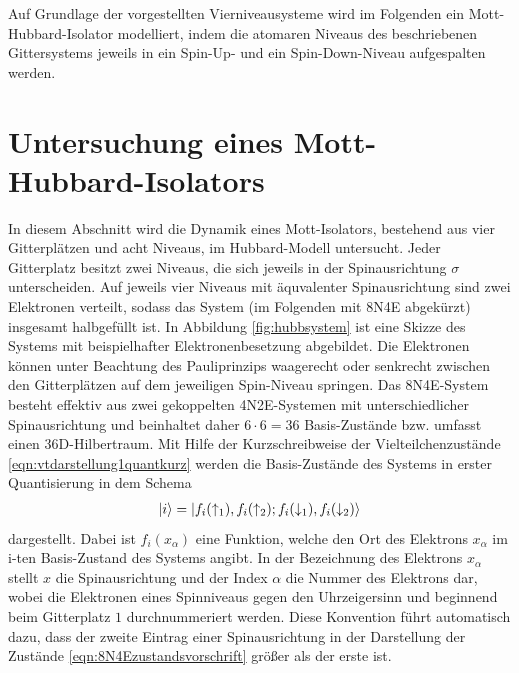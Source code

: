 Auf Grundlage der vorgestellten Vierniveausysteme wird im Folgenden ein Mott-Hubbard-Isolator modelliert, indem die atomaren Niveaus des
beschriebenen Gittersystems jeweils in ein Spin-Up- und ein Spin-Down-Niveau aufgespalten werden.

\section{Untersuchung eines Mott-Hubbard-Isolators}
\label{sec:untersuchunghubb}

In diesem Abschnitt wird die Dynamik eines Mott-Isolators, bestehend aus vier Gitterplätzen und acht Niveaus, im Hubbard-Modell untersucht.
Jeder Gitterplatz besitzt zwei Niveaus, die sich jeweils in der Spinausrichtung $\sigma$ unterscheiden.
Auf jeweils vier Niveaus mit äquvalenter Spinausrichtung sind zwei Elektronen verteilt, sodass das System (im Folgenden mit 8N4E abgekürzt) insgesamt halbgefüllt ist.
In Abbildung \ref{fig:hubbsystem} ist eine Skizze des Systems mit beispielhafter Elektronenbesetzung abgebildet.
Die Elektronen können unter Beachtung des Pauliprinzips waagerecht oder senkrecht zwischen den Gitterplätzen auf dem jeweiligen Spin-Niveau springen.
Das 8N4E-System besteht effektiv aus zwei gekoppelten 4N2E-Systemen mit unterschiedlicher Spinausrichtung und
beinhaltet daher $6 \cdot 6=36$ Basis-Zustände bzw. umfasst einen 36D-Hilbertraum.
Mit Hilfe der Kurzschreibweise der Vielteilchenzustände \eqref{eqn:vtdarstellung1quantkurz} werden die Basis-Zustände des Systems in erster Quantisierung in dem Schema
\begin{align}
  \ket{i} = \ket{f_i(\uparrow_1),f_i(\uparrow_2); f_i(\downarrow_1),f_i(\downarrow_2)}
  \label{eqn:8N4Ezustandsvorschrift}
\end{align}
dargestellt. Dabei ist $f_i(x_\alpha)$ eine Funktion, welche den Ort des Elektrons $x_\alpha$ im i-ten Basis-Zustand des Systems angibt.
In der Bezeichnung des Elektrons $x_\alpha$ stellt $x$ die Spinausrichtung und der Index $\alpha$ die Nummer des Elektrons dar, wobei die Elektronen eines Spinniveaus gegen den Uhrzeigersinn und beginnend beim Gitterplatz $1$ durchnummeriert werden.
Diese Konvention führt automatisch dazu, dass der zweite Eintrag einer Spinausrichtung in der Darstellung der Zustände \eqref{eqn:8N4Ezustandsvorschrift} größer als der erste ist.


